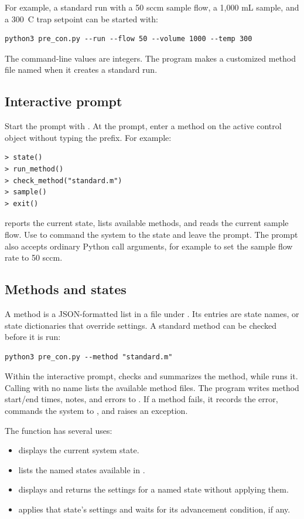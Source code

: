 For example, a standard run with a 50 sccm sample flow, a 1,000 mL sample,
and a 300~\textdegree C trap setpoint can be started with:
\begin{verbatim}
python3 pre_con.py --run --flow 50 --volume 1000 --temp 300
\end{verbatim}
The command-line values are integers. The program makes a customized method
file named  when it creates a standard run.

\subsection{Interactive prompt}

Start the prompt with . At the \code{>} prompt,
enter a method on the active control object without typing the 
prefix. For example:
\begin{verbatim}
> state()
> run_method()
> check_method("standard.m")
> sample()
> exit()
\end{verbatim}
 reports the current state,  lists available
methods, and  reads the current sample flow. Use
 to command the system to the  state and leave the
prompt. The prompt also accepts ordinary Python call arguments, for example
 to set the sample flow rate to 50 sccm.

\subsection{Methods and states}

A method is a JSON-formatted list in a file under . Its
entries are state names, or state dictionaries that override settings. A
standard method can be checked before it is run:
\begin{verbatim}
python3 pre_con.py --method "standard.m"
\end{verbatim}
Within the interactive prompt,  checks and
summarizes the method, while  runs it.
Calling  with no name lists the available method files.
The program writes method start/end times, notes, and errors to
. If a method fails, it records the error, commands
the system to , and raises an exception.

The  function has several uses:
\begin{itemize}
    \item {} displays the current system state.
    \item {} lists the named states available in
    .
    \item {} displays and returns the settings
    for a named state without applying them.
    \item {} applies that state's settings and waits for
    its advancement condition, if any.
\end{itemize}

